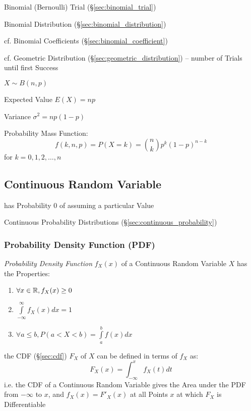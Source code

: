 Binomial (Bernoulli) Trial (\S\ref{sec:binomial_trial})

Binomial Distribution (\S\ref{sec:binomial_distribution})

cf. Binomial Coefficients (\S\ref{sec:binomial_coefficient})

\fist cf. Geometric Distribution (\S\ref{sec:geometric_distribution}) -- number
of Trials until first Success

$X \sim B(n,p)$

Expected Value $E(X) = np$

Variance $\sigma^2 = np(1-p)$

Probability Mass Function:
\[
  f(k,n,p) = P(X = k) = \binom{n}{k} p^k (1-p)^{n-k}
\]
for $k = 0,1,2, \ldots, n$



\subsection{Continuous Random Variable}\label{sec:continuous_random_variable}

has Probability $0$ of assuming a particular Value

\fist Continuous Probability Distributions (\S\ref{sec:continuous_probability})



\subsubsection{Probability Density Function (PDF)}\label{sec:pdf}

\emph{Probability Density Function} $f_X(x)$ of a Continuous Random Variable $X$
has the Properties:
\begin{enumerate}
  \item $\forall x \in \mathbb{R}, f_X(x) \geq 0$
  \item $\int\limits_{-\infty}^{\infty} f_X(x) dx = 1$
  \item $\forall a \leq b, P (a < X < b) = \int\limits_a^b f(x) dx$
\end{enumerate}
the CDF (\S\ref{sec:cdf}) $F_X$ of $X$ can be defined in terms of $f_X$ as:
\[
  F_X(x) = \int_{-\infty}^x f_X(t)dt
\]
i.e. the CDF of a Continuous Random Variable gives the Area under the PDF from
$-\infty$ to $x$, and $f_X(x) = F'_X(x)$ at all Points $x$ at which $F_X$ is
Differentiable

